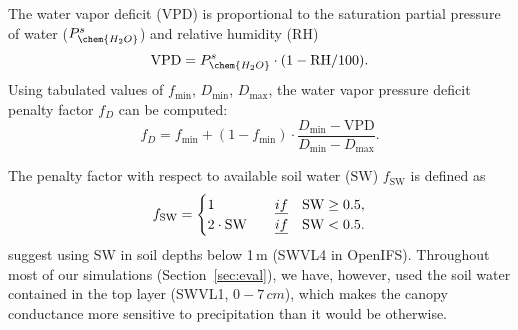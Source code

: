 \documentclass[gmd, manuscript]{copernicus}
\begin{document}
The water vapor deficit (VPD) is proportional to the saturation partial pressure of water ($P_\chem{H_2O}^s$) and relative humidity ($\text{RH}$)
%
\begin{equation}
  \text{VPD} = P_\chem{H_2O}^s \cdot (1 - \text{RH}/100).
\end{equation}
%
Using tabulated values of $f_\text{min}$, $D_\text{min}$, $D_\text{max}$, the water vapor pressure deficit penalty factor $f_D$ can be computed:
%
\begin{equation}
  f_D = f_\text{min}+(1-f_\text{min}) \cdot \frac{D_\text{min} - \text{VPD}}{D_\text{min}-D_\text{max}}.
\end{equation}

The penalty factor with respect to available soil water ($\text{SW}$) $f_\text{SW}$ is defined as 
%
\begin{equation}
  f_\text{SW} =
  \begin{cases}
    1 & \quad \emph{if} \quad \text{SW} \geq 0.5,\\
    2 \cdot \text{SW}  & \quad \emph{if} \quad \text{SW} < 0.5.
  \end{cases}
\end{equation}
\citet{ACP:Simpson2012} suggest using SW in soil depths below 1\,\unit{m} (SWVL4 in OpenIFS). Throughout most of our simulations (Section~\ref{sec:eval}), we have, however, used the soil water contained in the top layer (SWVL1, $0-7\,\unit{cm}$), which makes the canopy conductance more sensitive to precipitation than it would be otherwise.
\end{document}
